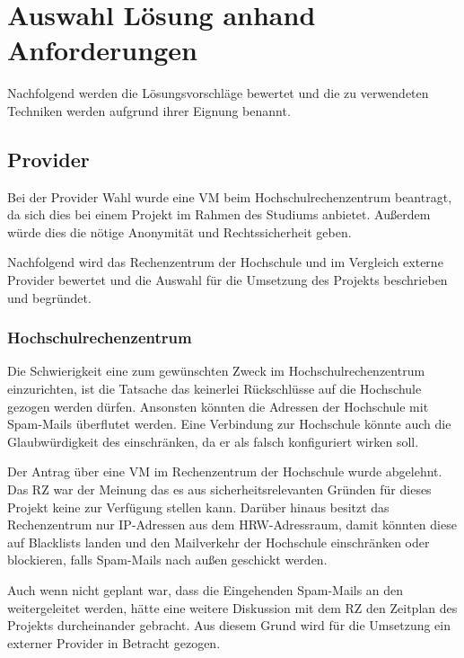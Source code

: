 \documentclass[a4paper,11pt,singlespacing]{article}
\begin{document}
\newpage
\section{Auswahl Lösung anhand Anforderungen}\label{sec:AuswahlLösungAnhandAnforderungen}
	Nachfolgend werden die Lösungsvorschläge bewertet und die zu verwendeten Techniken werden aufgrund ihrer Eignung benannt.
	\subsection{Provider}\label{sec:AuswahlLösungProvider}
		Bei der Provider Wahl wurde eine VM beim Hochschulrechenzentrum  beantragt, da sich dies bei einem Projekt im Rahmen des Studiums anbietet. Außerdem würde dies die nötige Anonymität und Rechtssicherheit geben.
		
		Nachfolgend wird das Rechenzentrum der Hochschule und im Vergleich externe Provider bewertet und die Auswahl für die Umsetzung des Projekts beschrieben und begründet.
		
		\subsubsection{Hochschulrechenzentrum}\label{sec:AuswahlLösungDMZHochschulrechenzentrum}
			Die Schwierigkeit eine  zum gewünschten Zweck im Hochschulrechenzentrum einzurichten, ist die Tatsache das keinerlei Rückschlüsse auf die Hochschule gezogen werden dürfen. Ansonsten könnten die Adressen der Hochschule mit Spam-Mails überflutet werden. Eine Verbindung zur Hochschule könnte auch die Glaubwürdigkeit des  einschränken, da er als falsch konfiguriert wirken soll.
			
			Der Antrag über eine VM im Rechenzentrum der Hochschule wurde abgelehnt. Das RZ war der Meinung das es aus sicherheitsrelevanten Gründen für dieses Projekt keine  zur Verfügung stellen kann. Darüber hinaus besitzt das Rechenzentrum nur IP-Adressen aus dem HRW-Adressraum, damit könnten diese auf Blacklists landen und den Mailverkehr der Hochschule einschränken oder blockieren, falls Spam-Mails nach außen geschickt werden.
			
			Auch wenn nicht geplant war, dass die Eingehenden Spam-Mails an den  weitergeleitet werden, hätte eine weitere Diskussion mit dem RZ den Zeitplan des Projekts durcheinander gebracht. Aus diesem Grund wird für die Umsetzung ein externer Provider in Betracht gezogen.
		
\end{document}
